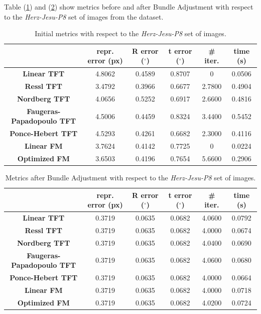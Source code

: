 Table (\ref{tab:HerzJesuInit}) and (\ref{tab:HerzJesuBA}) show metrics before and after Bundle Adjustment with respect to the \textit{Herz-Jesu-P8} set of images from the dataset.

\begin{table}[htbp]
  \centering
  \caption{Initial metrics with respect to the \textit{Herz-Jesu-P8} set of images.}
  \label{tab:HerzJesuInit}
  \begin{tabular}{|*{6}{c}|}
    \hline
     & repr. error (px) & R error ($^{\circ}$) & t error ($^{\circ}$) & \# iter. & time (s)\\
    \hline
    \textbf{Linear TFT} & 4.8062 & 0.4589 & 0.8707 & 0 & 0.0506 \\
    \textbf{Ressl TFT} & 3.4792 & 0.3966 & 0.6677 & 2.7800 & 0.4904 \\
    \textbf{Nordberg TFT} & 4.0656 & 0.5252 & 0.6917 & 2.6600 & 0.4816 \\
    \textbf{Faugeras-Papadopoulo TFT} & 4.5006 & 0.4459 & 0.8324 & 3.4400 & 0.5452 \\
    \textbf{Ponce-Hebert TFT} & 4.5293 & 0.4261 & 0.6682 & 2.3000 & 0.4116 \\
    \textbf{Linear FM} & 3.7624 & 0.4142 & 0.7725 & 0 & 0.0224 \\
    \textbf{Optimized FM} & 3.6503 & 0.4196 & 0.7654 & 5.6600 & 0.2906 \\
    \hline
  \end{tabular}
\end{table}

\begin{table}[htbp]
  \centering
  \caption{Metrics after Bundle Adjustment with respect to the \textit{Herz-Jesu-P8} set of images.}
  \label{tab:HerzJesuBA}
  \begin{tabular}{|*{6}{c}|}
    \hline
     & repr. error (px) & R error ($^{\circ}$) & t error ($^{\circ}$) & \# iter. & time (s)\\
    \hline
    \textbf{Linear TFT} & 0.3719 & 0.0635 & 0.0682 & 4.0600 & 0.0792 \\
    \textbf{Ressl TFT} & 0.3719 & 0.0635 & 0.0682 & 4.0000 & 0.0674 \\
    \textbf{Nordberg TFT} & 0.3719 & 0.0635 & 0.0682 & 4.0400 & 0.0690 \\
    \textbf{Faugeras-Papadopoulo TFT} & 0.3719 & 0.0635 & 0.0682 & 4.0600 & 0.0680 \\
    \textbf{Ponce-Hebert TFT} & 0.3719 & 0.0635 & 0.0682 & 4.0000 & 0.0664 \\
    \textbf{Linear FM} & 0.3719 & 0.0635 & 0.0682 & 4.0000 & 0.0718 \\
    \textbf{Optimized FM} & 0.3719 & 0.0635 & 0.0682 & 4.0200 & 0.0724 \\
    \hline
  \end{tabular}
\end{table}

\pagebreak
